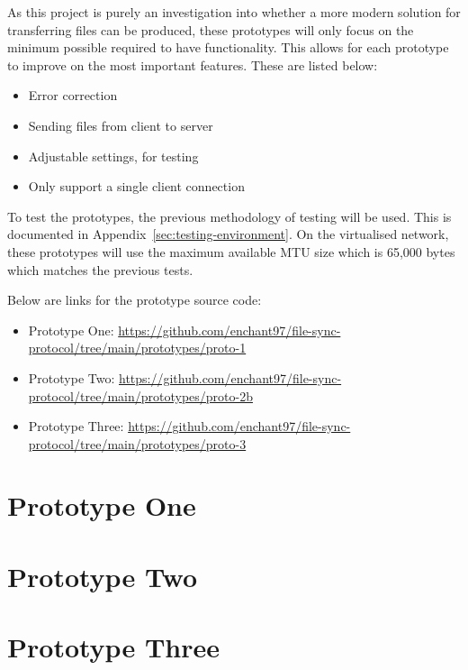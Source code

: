 As this project is purely an investigation into whether a more modern solution for transferring files can be produced, these prototypes will only focus on the minimum possible required to have functionality. This allows for each prototype to improve on the most important features. These are listed below:

\begin{itemize}
	\item Error correction
	\item Sending files from client to server
	\item Adjustable settings, for testing
	\item Only support a single client connection
\end{itemize}

To test the prototypes, the previous methodology of testing will be used. This is documented in Appendix~\ref{sec:testing-environment}. On the virtualised network, these prototypes will use the maximum available MTU size which is 65,000 bytes which matches the previous tests.

Below are links for the prototype source code:

\begin{itemize}
    \item Prototype One: \url{https://github.com/enchant97/file-sync-protocol/tree/main/prototypes/proto-1}
    \item Prototype Two: \url{https://github.com/enchant97/file-sync-protocol/tree/main/prototypes/proto-2b}
    \item Prototype Three: \url{https://github.com/enchant97/file-sync-protocol/tree/main/prototypes/proto-3}
\end{itemize}

\newpage
\section{Prototype One}

\newpage
\section{Prototype Two}

\newpage
\section{Prototype Three}

